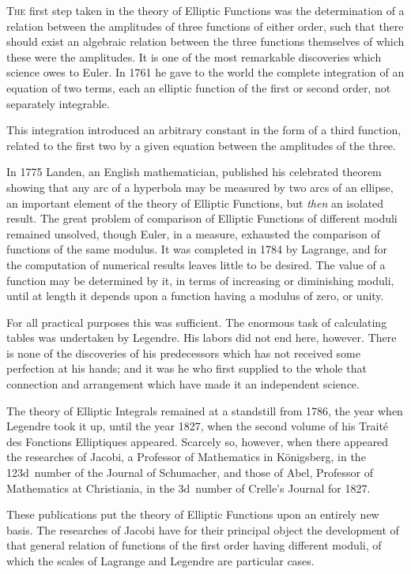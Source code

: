 \documentclass[12pt,leqno]{book}[2005/09/16]
\newcommand{\First}[1]{\textsc{#1}}
\newcommand{\DPtypo}[2]{#2}
\begin{document}
\First{The} first step taken in the theory of Elliptic Functions
was the determination of a relation between the amplitudes of
three functions of either order, such that there should exist an
algebraic relation between the three functions themselves of
which these were the amplitudes. It is one of the most remarkable
discoveries which science owes to Euler. In 1761 he
gave to the world the complete integration of an equation of
two terms, each an elliptic function of the first or second order,
not separately integrable.

This integration introduced an arbitrary constant in the
form of a third function, related to the first two by a given
equation between the amplitudes of the three.

In 1775 Landen, an English mathematician, published his
celebrated theorem showing that any arc of a hyperbola may
be measured by two arcs of an ellipse, an important element
of the theory of Elliptic Functions, but \emph{then} an isolated result.
The great problem of comparison of Elliptic Functions of different
moduli remained unsolved, though Euler, in a measure,
exhausted the comparison of functions of the same modulus.
It was completed in 1784 by Lagrange, and for the computation
of numerical results leaves little to be desired. The value of
a function may be determined by it, in terms of increasing or
diminishing moduli, until at length it depends upon a function
having a modulus of zero, or unity.

For all practical purposes this was sufficient. The enormous
task of calculating tables was undertaken by Legendre.
His labors did not end here, however. There is none of the
discoveries of his predecessors which has not received some
perfection at his hands; and it was he who first supplied to
the whole that connection and arrangement which have made
it an independent science.

The theory of Elliptic Integrals remained at a standstill
from 1786, the year when Legendre took it up, until the year
1827, when the second volume of his Traité des Fonctions
Elliptiques appeared. Scarcely so, however, when there appeared
the researches of Jacobi, a Professor of Mathematics in
Königsberg, in the 123d~number of the Journal of Schumacher,
and those of Abel, Professor of Mathematics at Christiania, in
the 3d~number of Crelle's Journal for 1827.

These publications put the theory of Elliptic Functions
upon an entirely new basis. The researches of Jacobi have for
their principal object the development of that general relation
of functions of the first order having different moduli, of which
the scales of \DPtypo{Legrange}{Lagrange} and Legendre are particular cases.
\end{document}
